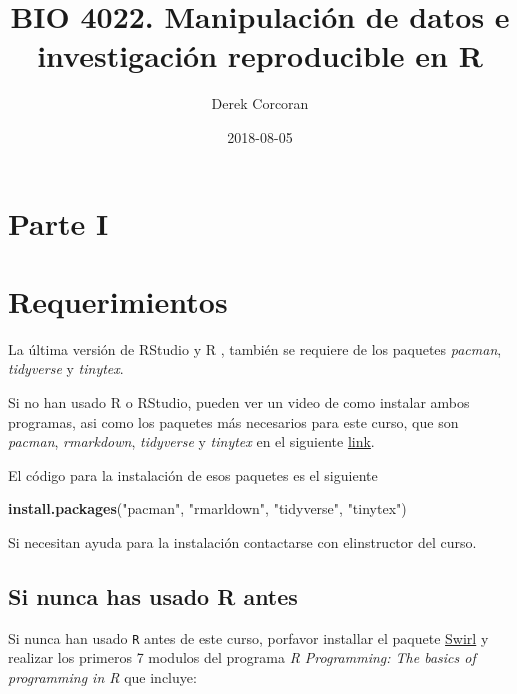 \documentclass[]{book}
\title{BIO 4022. Manipulación de datos e investigación reproducible en R}
\author{Derek Corcoran}
\date{2018-08-05}
\newenvironment{Shaded}{\begin{snugshade}}{\end{snugshade}}
\newcommand{\KeywordTok}[1]{\textcolor[rgb]{0.13,0.29,0.53}{\textbf{#1}}}
\newcommand{\NormalTok}[1]{#1}
\newcommand{\StringTok}[1]{\textcolor[rgb]{0.31,0.60,0.02}{#1}}
\begin{document}
\maketitle

{
\setcounter{tocdepth}{1}
\tableofcontents
}
\hypertarget{parte-i}{%
\chapter*{Parte I}\label{parte-i}}

\hypertarget{requerimientos}{%
\chapter{Requerimientos}\label{requerimientos}}

La última versión de RStudio y R \citep{R-base}, también se requiere de
los paquetes \emph{pacman}, \emph{tidyverse} y \emph{tinytex}.

Si no han usado R o RStudio, pueden ver un video de como instalar ambos
programas, asi como los paquetes más necesarios para este curso, que son
\emph{pacman}, \emph{rmarkdown}, \emph{tidyverse} y \emph{tinytex} en el
siguiente \href{https://youtu.be/RtkCAKXsVbw}{link}.

El código para la instalación de esos paquetes es el siguiente

\begin{Shaded}
\begin{Highlighting}[]
\KeywordTok{install.packages}\NormalTok{(}\StringTok{"pacman"}\NormalTok{, }\StringTok{"rmarldown"}\NormalTok{, }\StringTok{"tidyverse"}\NormalTok{, }\StringTok{"tinytex"}\NormalTok{)}
\end{Highlighting}
\end{Shaded}

Si necesitan ayuda para la instalación contactarse con elinstructor del
curso.

\hypertarget{si-nunca-has-usado-r-antes}{%
\section{Si nunca has usado R antes}\label{si-nunca-has-usado-r-antes}}

Si nunca han usado \texttt{R} antes de este curso, porfavor installar el
paquete \href{http://swirlstats.com/students.html}{Swirl}
\citep{Kross2017} y realizar los primeros 7 modulos del programa \emph{R
Programming: The basics of programming in R} que incluye:
\end{document}
